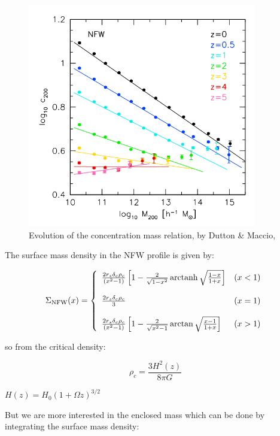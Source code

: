 \begin{appendices}
\begin{figure}[H]
\centering
\includegraphics[width=10cm]{images/dutton.png}
\caption[Evolution of the concentration mass relation]{Evolution of the concentration mass relation, by Dutton \& Maccio, \citeyear{Reference23}}
\end{figure}

The surface mass density in the NFW profile is given by:

\begin{equation}
\Sigma_{\text{NFW}}(x) = \left\lbrace
\begin{array}{lll}
\frac{2r_{s}\delta_{c}\rho_{c}}{\left(x^{2}-1\right)}\left[1-\frac{2}{\sqrt{1-x^{2}}}\operatorname{arctanh}\sqrt{\frac{1-x}{1+x}}\right] & (x<1)\\\\
\frac{2r_{s}\delta_{c}\rho_{c}}{3} & (x=1)\\\\
\frac{2r_{s}\delta_{c}\rho_{c}}{\left(x^{2}-1\right)}\left[1-\frac{2}{\sqrt{x^{2}-1}}\arctan\sqrt{\frac{x-1}{1+x}}\right] & (x>1)
\end{array}
\right.
\end{equation} 

so from the critical density:

\begin{equation}
\rho_{c}=\frac{3H^2(z)}{8\pi G}
\end{equation}

$H(z)=H_{0}(1+\Omega z)^{3/2}$

But we are more interested in the enclosed mass which can be done by integrating the surface mass density:


\end{appendices}
